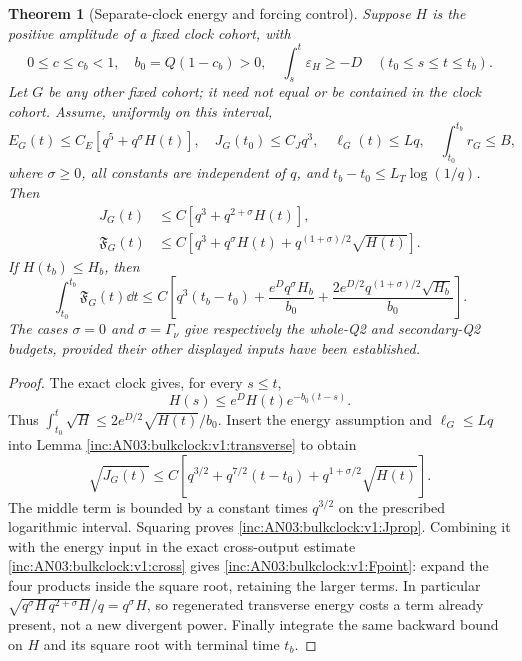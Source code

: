 \documentclass[11pt]{article}
\newtheorem{theorem}{Theorem}[section]
\theoremstyle{remark}\newtheorem{remark}[theorem]{Remark}
\begin{document}
\begin{theorem}[Separate-clock energy and forcing control]
\label{inc:AN03:bulkclock:v1:forcing}
Suppose $H$ is the positive amplitude of a fixed clock cohort, with
\[
 0\le c\le c_b<1,\quad b_0=Q(1-c_b)>0,\quad
 \int_s^t\varepsilon_H\ge-D\quad(t_0\le s\le t\le t_b).
\]
Let $G$ be any other fixed cohort; it need not equal or be contained in the clock cohort. Assume, uniformly on this interval,
\begin{equation}\label{inc:AN03:bulkclock:v1:forcinginputs}
 E_G(t)\le C_E[q^5+q^\sigma H(t)],\quad
 J_G(t_0)\le C_Jq^3,\quad
 \ell_G(t)\le Lq,\quad \int_{t_0}^{t_b}r_G\le B,
\end{equation}
where $\sigma\ge0$, all constants are independent of $q$, and
$t_b-t_0\le L_T\log(1/q)$. Then
\begin{align}
 J_G(t)&\le C[q^3+q^{2+\sigma}H(t)],
 \label{inc:AN03:bulkclock:v1:Jprop}\\
 \mathfrak F_G(t)&\le C[q^3+q^\sigma H(t)
                  +q^{(1+\sigma)/2}\sqrt{H(t)}].
 \label{inc:AN03:bulkclock:v1:Fpoint}
\end{align}
If $H(t_b)\le H_b$, then
\begin{equation}\label{inc:AN03:bulkclock:v1:Fintegral}
 \int_{t_0}^{t_b}\mathfrak F_G(t)\dd t
 \le C\left[q^3(t_b-t_0)+
 \frac{e^Dq^\sigma H_b}{b_0}+
 \frac{2e^{D/2}q^{(1+\sigma)/2}\sqrt{H_b}}{b_0}\right].
\end{equation}
The cases $\sigma=0$ and $\sigma=\Gamma_\nu$ give respectively the whole-Q2 and secondary-Q2 budgets, provided their other displayed inputs have been established.
\end{theorem}
\begin{proof}
The exact clock gives, for every $s\le t$,
\[
 H(s)\le e^DH(t)e^{-b_0(t-s)}.
\]
Thus $\int_{t_0}^t\sqrt H\le2e^{D/2}\sqrt{H(t)}/b_0$. Insert the energy assumption and $\ell_G\le Lq$ into Lemma \ref{inc:AN03:bulkclock:v1:transverse} to obtain
\[
 \sqrt{J_G(t)}\le C\left[q^{3/2}+q^{7/2}(t-t_0)
                  +q^{1+\sigma/2}\sqrt{H(t)}\right].
\]
The middle term is bounded by a constant times $q^{3/2}$ on the prescribed logarithmic interval. Squaring proves \eqref{inc:AN03:bulkclock:v1:Jprop}. Combining it with the energy input in the exact cross-output estimate \eqref{inc:AN03:bulkclock:v1:cross} gives \eqref{inc:AN03:bulkclock:v1:Fpoint}: expand the four products inside the square root, retaining the larger terms. In particular $\sqrt{q^\sigma H\,q^{2+\sigma}H}/q=q^\sigma H$, so regenerated transverse energy costs a term already present, not a new divergent power. Finally integrate the same backward bound on $H$ and its square root with terminal time $t_b$.
\end{proof}
\end{document}
